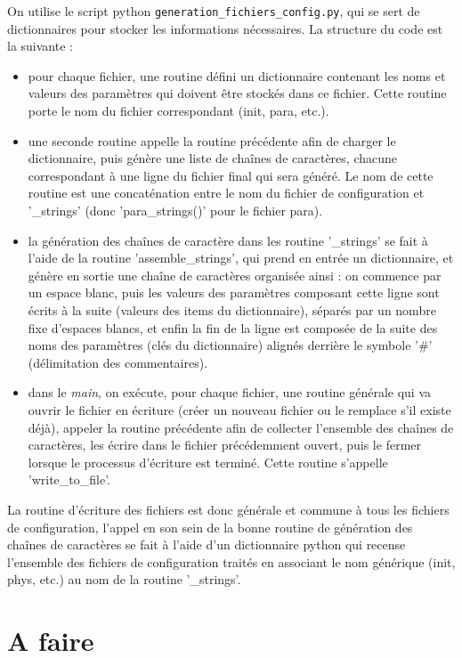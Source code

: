 \documentclass{article} %
\begin{document}
On utilise le script python \verb+generation_fichiers_config.py+, qui se sert de dictionnaires pour stocker les informations nécessaires. La structure du code est la suivante :
\begin{itemize}
    \item   pour chaque fichier, une routine défini un dictionnaire contenant les noms et valeurs des paramètres qui doivent être stockés dans ce fichier. Cette routine porte le nom du fichier correspondant (init, para, etc.).
    \item   une seconde routine appelle la routine précédente afin de charger le dictionnaire, puis génère une liste de chaînes de caractères, chacune correspondant à une ligne du fichier final qui sera généré. Le nom de cette routine est une concaténation entre le nom du fichier de configuration et '\_strings' (donc 'para\_strings()' pour le fichier para).
    \item   la génération des chaînes de caractère dans les routine '\_strings' se fait à l'aide de la routine 'assemble\_strings', qui prend en entrée un dictionnaire, et génère en sortie une chaîne de caractères organisée ainsi : on commence par un espace blanc, puis les valeurs des paramètres composant cette ligne sont écrits à la suite (valeurs des items du dictionnaire), séparés par un nombre fixe d'espaces blancs, et enfin la fin de la ligne est composée de la suite des noms des paramètres (clés du dictionnaire) alignés derrière le symbole '\#' (délimitation des commentaires).
    \item   dans le \textit{main}, on exécute, pour chaque fichier, une routine générale qui va ouvrir le fichier en écriture (créer un nouveau fichier ou le remplace s'il existe déjà), appeler la routine précédente afin de collecter l'ensemble des chaînes de caractères, les écrire dans le fichier précédemment ouvert, puis le fermer lorsque le processus d'écriture est terminé. Cette routine  s'appelle 'write\_to\_file'.
\end{itemize}
La routine d'écriture des fichiers est donc générale et commune à tous les fichiers de configuration, l'appel en son sein de la bonne routine de génération des chaînes de caractères se fait à l'aide d'un dictionnaire python qui recense l'ensemble des fichiers de configuration traités en associant le nom générique (init, phys, etc.) au nom de la routine '\_strings'.

\section{A faire}
\end{document}
